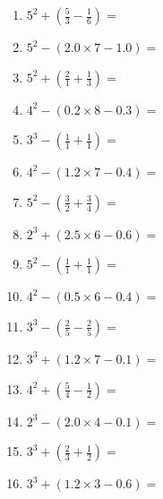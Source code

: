 \documentclass[12pt]{article}
\begin{document}
\begin{enumerate}
\item \large $ 5^{2} + (\frac{5}{3} - \frac{1}{6}) = $ \vspace{1.6cm}
\item \large $ 5^{2} - (2.0 \times 7 - 1.0) = $ \vspace{1.6cm}
\item \large $ 5^{2} + (\frac{2}{1} + \frac{1}{3}) = $ \vspace{1.6cm}
\item \large $ 4^{2} - (0.2 \times 8 - 0.3) = $ \vspace{1.6cm}
\item \large $ 3^{3} - (\frac{1}{1} + \frac{1}{1}) = $ \vspace{1.6cm}
\item \large $ 4^{2} - (1.2 \times 7 - 0.4) = $ \vspace{1.6cm}
\newpage
\item \large $ 5^{2} - (\frac{3}{2} + \frac{3}{4}) = $ \vspace{1.6cm}
\item \large $ 2^{3} + (2.5 \times 6 - 0.6) = $ \vspace{1.6cm}
\item \large $ 5^{2} - (\frac{1}{1} + \frac{1}{1}) = $ \vspace{1.6cm}
\item \large $ 4^{2} - (0.5 \times 6 - 0.4) = $ \vspace{1.6cm}
\item \large $ 3^{3} - (\frac{2}{5} - \frac{2}{5}) = $ \vspace{1.6cm}
\item \large $ 3^{3} + (1.2 \times 7 - 0.1) = $ \vspace{1.6cm}
\item \large $ 4^{2} + (\frac{5}{4} - \frac{1}{2}) = $ \vspace{1.6cm}
\item \large $ 2^{3} - (2.0 \times 4 - 0.1) = $ \vspace{1.6cm}
\item \large $ 3^{3} + (\frac{2}{3} + \frac{1}{2}) = $ \vspace{1.6cm}
\item \large $ 3^{3} + (1.2 \times 3 - 0.6) = $ \vspace{1.6cm}
\end{enumerate}\newpage
\end{document}
